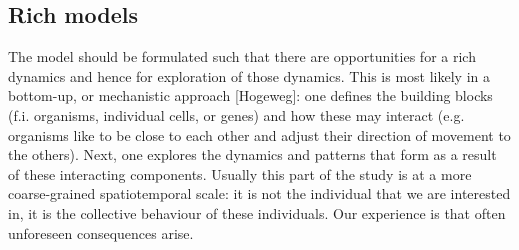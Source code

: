 \subsection{Rich models}

The model should be formulated such that there are opportunities for a rich dynamics and hence for exploration of those dynamics. This is most likely in a bottom-up, or mechanistic approach [Hogeweg]: one defines the building blocks (f.i. organisms, individual cells, or genes) and how these may interact (e.g. organisms like to be close to each other and adjust their direction of movement to the others). Next, one explores the dynamics and patterns that form as a result of these interacting components. Usually this part of the study is at a more coarse-grained spatiotemporal scale: it is not the individual that we are interested in, it is the collective behaviour of these individuals. Our experience is that often unforeseen consequences arise.